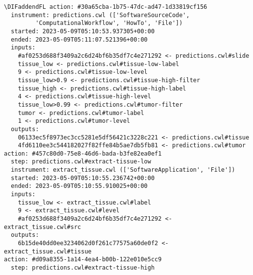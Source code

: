 \documentclass[10pt,letterpaper]{article}
\providecommand{\DIFdelbegin}{} %
\providecommand{\DIFaddbeginFL}{} %
\providecommand{\DIFaddendFL}{} %
\providecommand{\DIFdelendFL}{} %
\newcommand{\DIFscaledelfig}{0.5}
\newlength{\DIFdelgraphicswidth} %
\newlength{\DIFdelgraphicsheight} %
\newcommand{\DIFaddincludegraphics}[2][]{{\color{blue}\fbox{\DIFOincludegraphics[#1]{#2}}}} %
\newcommand{\DIFdelincludegraphics}[2][]{%
\sbox{\DIFdelgraphicsbox}{\DIFOincludegraphics[#1]{#2}}%
\settoboxwidth{\DIFdelgraphicswidth}{\DIFdelgraphicsbox} %
\settoboxtotalheight{\DIFdelgraphicsheight}{\DIFdelgraphicsbox} %
\scalebox{\DIFscaledelfig}{%
\parbox[b]{\DIFdelgraphicswidth}{\usebox{\DIFdelgraphicsbox}\\[-\baselineskip] \rule{\DIFdelgraphicswidth}{0em}}\llap{\resizebox{\DIFdelgraphicswidth}{\DIFdelgraphicsheight}{%
\setlength{\unitlength}{\DIFdelgraphicswidth}%
\begin{picture}(1,1)%
\thicklines\linethickness{2pt} %
{\color[rgb]{1,0,0}\put(0,0){\framebox(1,1){}}}%
{\color[rgb]{1,0,0}\put(0,0){\line( 1,1){1}}}%
{\color[rgb]{1,0,0}\put(0,1){\line(1,-1){1}}}%
\end{picture}%
}\hspace*{3pt}}} %
} %
\DeclareRobustCommand{\DIFdelbegin}{\DIFOdelbegin \let\includegraphics\DIFdelincludegraphics} %
\DeclareRobustCommand{\DIFaddbeginFL}{\DIFOaddbeginFL \let\includegraphics\DIFaddincludegraphics} %
\DeclareRobustCommand{\DIFaddendFL}{\DIFOaddendFL \let\includegraphics\DIFOincludegraphics} %
\DeclareRobustCommand{\DIFdelendFL}{\DIFOaddendFL \let\includegraphics\DIFOincludegraphics} %
\begin{document}
\DIFdelbegin %
\DIFdelendFL %
\DIFaddbeginFL \begin{lstlisting}[float,basicstyle=\scriptsize\ttfamily,caption={Output of the \texttt{runcrate report} command executed on the Provenance Run Crate generated by StreamFlow in the digital pathology inference use case (Section~\ref{provenance-run-crate-for-digital-pathology}). This informal listing of relevant RO-Crate entities describes each step of the execution. Note that inputs and outputs are of different types (not shown): e.g., \texttt{tissue\_low>0.9} is a string parameter, \texttt{6b15de\dots} is a filename, and \texttt{\#af0253\dots} is a collection.},label={lst:ml_pipeline_streamflow_report}]
\DIFaddendFL action: #30a65cba-1b75-47dc-ad47-1d33819cf156
  instrument: predictions.cwl (['SoftwareSourceCode', 
         'ComputationalWorkflow', 'HowTo', 'File'])
  started: 2023-05-09T05:10:53.937305+00:00
  ended: 2023-05-09T05:11:07.521396+00:00
  inputs:
    #af0253d688f3409a2c6d24bf6b35df7c4e271292 <- predictions.cwl#slide
    tissue_low <- predictions.cwl#tissue-low-label
    9 <- predictions.cwl#tissue-low-level
    tissue_low>0.9 <- predictions.cwl#tissue-high-filter
    tissue_high <- predictions.cwl#tissue-high-label
    4 <- predictions.cwl#tissue-high-level
    tissue_low>0.99 <- predictions.cwl#tumor-filter
    tumor <- predictions.cwl#tumor-label
    1 <- predictions.cwl#tumor-level
  outputs:
    06133ec5f8973ec3cc5281e5df56421c3228c221 <- predictions.cwl#tissue
    4fd6110ee3c544182027f82ffe84b5ae7db5fb81 <- predictions.cwl#tumor
action: #457c80d0-75e8-46d6-bada-b3fe82ea0ef1
  step: predictions.cwl#extract-tissue-low
  instrument: extract_tissue.cwl (['SoftwareApplication', 'File'])
  started: 2023-05-09T05:10:55.236742+00:00
  ended: 2023-05-09T05:10:55.910025+00:00
  inputs:
    tissue_low <- extract_tissue.cwl#label
    9 <- extract_tissue.cwl#level
    #af0253d688f3409a2c6d24bf6b35df7c4e271292 <- extract_tissue.cwl#src
  outputs:
    6b15de40dd0ee3234062d0f261c77575a60de0f2 <- extract_tissue.cwl#tissue
action: #d09a8355-1a14-4ea4-b00b-122e010e5cc9
  step: predictions.cwl#extract-tissue-high

\end{lstlisting}
\end{document}
